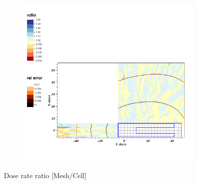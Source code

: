 \begin{figure}
\begin{subfigure}{0.1\textwidth}
    \end{subfigure}
    \begin{subfigure}{0.79\textwidth}
        \centering
        \includegraphics[scale=0.5, trim={4cm 2cm 1cm 12cm}, clip]{figs/dose_ratio_mat_aligned.png}
    \end{subfigure}
    \caption{Dose rate ratio [Mesh/Cell]}
    \label{fig:n_ratio_larger}
\end{figure}




